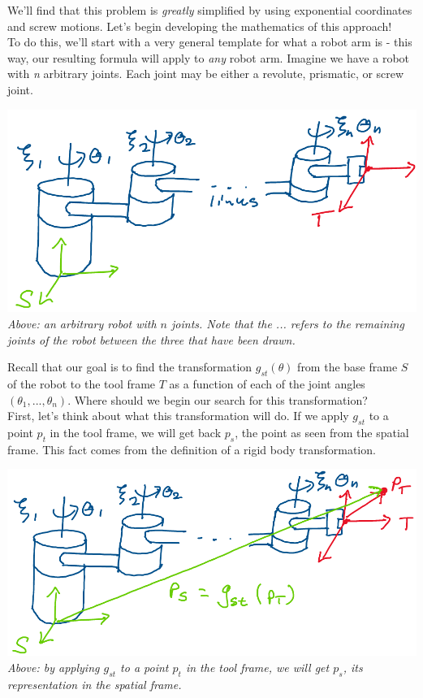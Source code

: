 \documentclass[oneside]{book}
\begin{document}
We'll find that this problem is \textit{greatly} simplified by using exponential coordinates and screw motions. Let's begin developing the mathematics of this approach!\\
To do this, we'll start with a very general template for what a robot arm is - this way, our resulting formula will apply to \textit{any} robot arm. Imagine we have a robot with \textit{n} arbitrary joints. Each joint may be either a revolute, prismatic, or screw joint.
\begin{center}
    \includegraphics[scale=0.3]{images/forwardKinRobot.png}\\
    \textit{Above: an arbitrary robot with $n$ joints. Note that the ... refers to the remaining joints of the robot between the three that have been drawn.}
\end{center}
Recall that our goal is to find the transformation $g_{st}(\theta)$ from the base frame $S$ of the robot to the tool frame $T$  as a function of each of the joint angles $(\theta_1, ..., \theta_n)$. Where should we begin our search for this transformation?\\
First, let's think about what this transformation will do. If we apply $g_{st}$ to a point $p_t$ in the tool frame, we will get back $p_s$, the point as seen from the spatial frame. This fact comes from the definition of a rigid body transformation.
\begin{center}
    \includegraphics[scale=0.3]{images/forwardKinTransf.png}\\
    \textit{Above: by applying $g_{st}$ to a point $p_t$ in the tool frame, we will get $p_s$, its representation in the spatial frame.}
\end{center}
\end{document}
